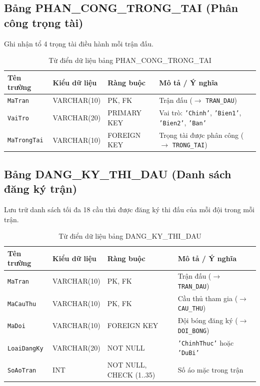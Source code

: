 \subsection{Bảng PHAN\_CONG\_TRONG\_TAI (Phân công trọng tài)}
Ghi nhận tổ 4 trọng tài điều hành mỗi trận đấu.
\begin{table}[H]
\centering
\small
\begin{tabular}{|l|l|l|p{6cm}|}
\hline
\textbf{Tên trường} & \textbf{Kiểu dữ liệu} & \textbf{Ràng buộc} & \textbf{Mô tả / Ý nghĩa} \\ \hline
\texttt{MaTran} & VARCHAR(10) & PK, FK & Trận đấu ($\rightarrow$ \texttt{TRAN\_DAU}) \\ \hline
\texttt{VaiTro} & VARCHAR(20) & PRIMARY KEY & Vai trò: \texttt{'Chinh'}, \texttt{'Bien1'}, \texttt{'Bien2'}, \texttt{'Ban'} \\ \hline
\texttt{MaTrongTai} & VARCHAR(10) & FOREIGN KEY & Trọng tài được phân công ($\rightarrow$ \texttt{TRONG\_TAI}) \\ \hline
\end{tabular}
\caption{Từ điển dữ liệu bảng PHAN\_CONG\_TRONG\_TAI}
\end{table}

\subsection{Bảng DANG\_KY\_THI_DAU (Danh sách đăng ký trận)}
Lưu trữ danh sách tối đa 18 cầu thủ được đăng ký thi đấu của mỗi đội trong mỗi trận.
\begin{table}[H]
\centering
\small
\begin{tabular}{|l|l|l|p{6cm}|}
\hline
\textbf{Tên trường} & \textbf{Kiểu dữ liệu} & \textbf{Ràng buộc} & \textbf{Mô tả / Ý nghĩa} \\ \hline
\texttt{MaTran} & VARCHAR(10) & PK, FK & Trận đấu ($\rightarrow$ \texttt{TRAN\_DAU}) \\ \hline
\texttt{MaCauThu} & VARCHAR(10) & PK, FK & Cầu thủ tham gia ($\rightarrow$ \texttt{CAU\_THU}) \\ \hline
\texttt{MaDoi} & VARCHAR(10) & FOREIGN KEY & Đội bóng đăng ký ($\rightarrow$ \texttt{DOI\_BONG}) \\ \hline
\texttt{LoaiDangKy} & VARCHAR(20) & NOT NULL & \texttt{'ChinhThuc'} hoặc \texttt{'DuBi'} \\ \hline
\texttt{SoAoTran} & INT & NOT NULL, CHECK (1..35) & Số áo mặc trong trận \\ \hline
\end{tabular}
\caption{Từ điển dữ liệu bảng DANG\_KY\_THI\_DAU}
\end{table}

